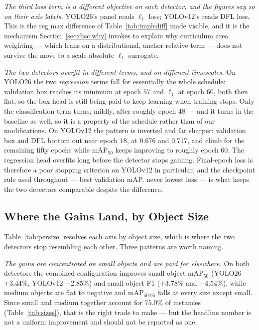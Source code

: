 \documentclass[10pt,twocolumn,a4paper]{article}
\begin{document}
\emph{The third loss term is a different objective on each detector, and the
figures say so on their axis labels.} YOLO26's panel reads $\ell_1$ loss;
YOLOv12's reads DFL loss. This is the $\mathrm{reg\_max}$ difference of
Table~\ref{tab:implsdiff} made visible, and it is the mechanism
Section~\ref{sec:disc:why} invokes to explain why curriculum area weighting ---
which leans on a distributional, anchor-relative term --- does not survive the
move to a scale-absolute $\ell_1$ surrogate.

\emph{The two detectors overfit in different terms, and on different
timescales.} On YOLO26 the two \emph{regression} terms fall for essentially the
whole schedule: validation box reaches its minimum at epoch $57$ and $\ell_1$ at
epoch $60$, both then flat, so the box head is still being paid to keep learning
when training stops. Only the classification term turns, mildly, after roughly
epoch $48$ --- and it turns in the baseline as well, so it is a property of the
schedule rather than of our modifications. On YOLOv12 the pattern is inverted
and far sharper: validation box and DFL bottom out near epoch $18$, at $0.676$
and $0.717$, and climb for the remaining fifty epochs while mAP$_{50}$ keeps
improving to roughly epoch $60$. The regression head overfits long before the
detector stops gaining. Final-epoch loss is therefore a poor stopping criterion
on YOLOv12 in particular, and the checkpoint rule used throughout --- best
validation mAP, never lowest loss --- is what keeps the two detectors
comparable despite the difference.



\subsection{Where the Gains Land, by Object Size}
\label{sec:results:persize}



Table~\ref{tab:persize} resolves each axis by object size, which is where the
two detectors stop resembling each other. Three patterns are worth naming.

\emph{The gains are concentrated on small objects and are paid for elsewhere.}
On both detectors the combined configuration improves small-object mAP$_{50}$
(YOLO26 $+3.44\%$, YOLOv12 $+2.85\%$) and small-object F1 ($+3.78\%$ and
$+4.54\%$), while medium objects are flat to negative and mAP$_{50\text{-}95}$
falls at every size except small. Since small and medium together account for
$75.0\%$ of instances (Table~\ref{tab:sizes}), that is the
right trade to make --- but the headline number is
not a uniform improvement and should not be reported as one.
\end{document}
